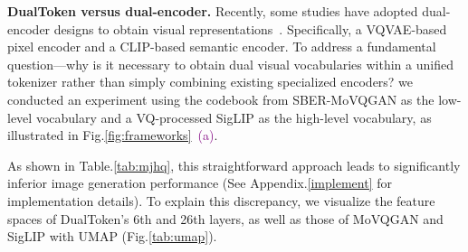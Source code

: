 \textbf{DualToken versus dual-encoder.} Recently, some studies have adopted dual-encoder designs to obtain visual representations~\citep{huang2025illume+}. Specifically, a VQVAE-based pixel encoder and a CLIP-based semantic encoder. To address a fundamental question---why is it necessary to obtain dual visual vocabularies within a unified tokenizer rather than simply combining existing specialized encoders? we conducted an experiment using the codebook from SBER-MoVQGAN as the low-level vocabulary and a VQ-processed SigLIP as the high-level vocabulary, as illustrated in Fig.\ref{fig:frameworks}~\textcolor{purple}{(a)}.

\begin{minipage}[h]{0.33\textwidth}
    As shown in Table.\ref{tab:mjhq}, this straightforward approach leads to significantly inferior image generation performance (See Appendix.\ref{implement} for implementation details). To explain this discrepancy, we visualize the feature spaces of DualToken’s 6th and 26th layers, as well as those of MoVQGAN and SigLIP with UMAP (Fig.\ref{tab:umap}).
\end{minipage}
\hfill
\begin{minipage}[h]{0.35\textwidth}
\vspace{-0.05cm}
    \centering
    \captionsetup{type=table}
    \caption{Results on the MJHQ-30K dataset~\citep{playground}.}
    \vspace{-0.1cm}
    \label{tab:mjhq}
\end{minipage}
